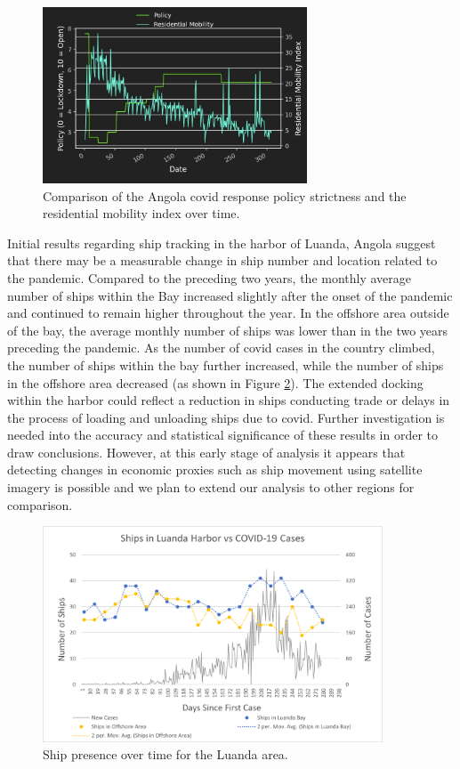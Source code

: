 \begin{figure}[!htb]
\centering
\includegraphics[width=0.7\textwidth]{Figures/chap5/Policy_nat_residential_mob.jpg}
\caption[Angola COVID-19 Policy \& Residential Mobility]{Comparison of the Angola \ac{covid} response policy strictness and the residential mobility index over time.}
\label{fig:policy-residential-mob}
\end{figure}


Initial results regarding ship tracking in the harbor of Luanda, Angola suggest that there may be a measurable change in ship number and location related to the pandemic. Compared to the preceding two years, the monthly average number of ships within the Bay increased slightly after the onset of the pandemic and continued to remain higher throughout the year. In the offshore area outside of the bay, the average monthly number of ships was lower than in the two years preceding the pandemic. As the number of \ac{covid} cases in the country climbed, the number of ships within the bay further increased, while the number of ships in the offshore area decreased (as shown in Figure \ref{fig:shipst}). The extended docking within the harbor could reflect a reduction in ships conducting trade or delays in the process of loading and unloading ships due to \ac{covid}.  Further investigation is needed into the accuracy and statistical significance of these results in order to draw conclusions. However, at this early stage of analysis it appears that detecting changes in economic proxies such as ship movement using satellite imagery is possible and we plan to extend our analysis to other regions for comparison.

\begin{figure}[!htb]
\centering
\includegraphics[width=0.9\textwidth]{Figures/chap5/ships_over_time.png}
\caption{Ship presence over time for the Luanda area.}
\label{fig:shipst}
\end{figure}

